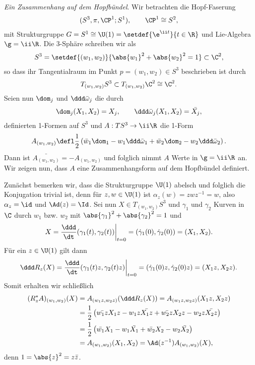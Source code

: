 \documentclass[%
	paper=a5,%
	fleqn,%
	DIV=18,%
	BCOR=0mm,
	fontsize=11pt,
	titlepage=false,%
	bibliography=totoc,
	DIV=18,%
	twoside=true,
	pdftitle=Riemannsche Geometrie,
	pdfauthor=Uwe Semmelmann,
	numbers=noendperiod]%
	{scrbook}
\begin{document}
\begin{ex}
\newcommand{\dqomega}{\ddd \bar{\omega}}
\textit{Ein Zusammenhang auf dem Hopfbündel}.
Wir betrachten die Hopf-Faserung
\begin{align*}
(S^3,\pi,\CP^1;S^1),\qquad \CP^1 \cong S^2,
\end{align*}
mit Strukturgruppe $G = S^1\cong \U(1) = \setdef{\e^{\ii t}}{t\in\R}$ und
Lie-Algebra $\g = \ii\R$. Die 3-Sphäre schreiben wir als
\begin{align*}
S^3 = \setdef{(w_1,w_2)}{\abs{w_1}^2 + \abs{w_2}^2 = 1} \subset\C^2,
\end{align*}
so dass ihr Tangentialraum im Punkt $p=(w_1,w_2)\in S^3$ beschrieben ist durch
\begin{align*}
T_{(w_1,w_2)}S^3\subset T_{(w_1,w_2)}\C^2 \cong \C^2.
\end{align*}
Seien nun $\dom_j$ und $\dqomega_j$ die durch
\begin{align*}
\dom_j(X_1,X_2) = X_j,\qquad \dqomega_j(X_1,X_2) = \bar{X_j},
\end{align*}
definierten 1-Formen auf $S^3$ und $A: TS^3\to \ii\R$ die 1-Form
\begin{align*}
A_{(w_1,w_2)} \defl \frac{1}{2}\left(\bar{w}_1 \dom_1 - w_1\dqomega_1
+ \bar{w}_2 \dom_2 - w_2\dqomega_2\right).
\end{align*}
Dann ist $\bar{A_{(w_1,w_2)}} = - A_{(w_1,w_2)}$ und folglich nimmt $A$ Werte in
$\g = \ii\R$ an.
Wir zeigen nun, dass $A$ eine Zusammenhangsform auf dem
Hopfbündel definiert.

Zunächst bemerken wir, dass die Strukturgruppe $\U(1)$
abelsch und folglich die Konjugation trivial ist, denn für $z,w\in \U(1)$
ist $\alpha_z(w) = zwz^{-1} = w$, also $\alpha_z = \id$ und $\Ad(z) = \Id$.
Sei nun $X\in T_{(w_1,w_2)}S^3$ und $\gamma_1$ und $\gamma_2$ Kurven in $\C$
durch $w_1$ bzw. $w_2$ mit $\abs{\gamma_1}^2 + \abs{\gamma_2}^2
= 1$ und
\begin{align*}
X = \frac{\ddd}{\dt} (\gamma_1(t),\gamma_2(t))\bigg|_{t=0}
= (\dot{\gamma}_1(0),\dot{\gamma}_2(0)) = (X_1,X_2).
\end{align*} 
Für ein $z\in \U(1)$ gilt dann
\begin{align*}
\ddd R_z(X) = \frac{\ddd}{\dt} (\gamma_1(t)z,\gamma_2(t)z)\bigg|_{t=0}
= (\dot{\gamma}_1(0)z,\dot{\gamma}_2(0)z) = (X_1z,X_2z).
\end{align*}
Somit erhalten wir schließlich
\begin{align*}
(R_z^*A)_{(w_1,w_2)}(X) &= A_{(w_1z,w_2z)}(\ddd R_{z}(X))
= A_{(w_1z,w_2z)}(X_1z,X_2z)\\
&= \frac{1}{2}
\left(\bar{w_1z}X_1z - w_1z\bar{X_1z} + \bar{w_2z}X_2z - w_2z\bar{X_2z}
\right)\\
&= \frac{1}{2}
\left(\bar{w_1}X_1 - w_1\bar{X_1} + \bar{w_2}X_2 - w_2\bar{X_2}
\right)\\
&= A_{(w_1,w_2)}(X_1,X_2) = \Ad(z^{-1})A_{(w_1,w_2)}(X), 
\end{align*}
denn $1 = \abs{z}^2 = z\bar{z}$.


\end{ex}
\end{document}
